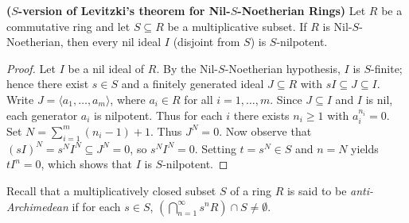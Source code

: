 \documentclass[11pt]{article}
\begin{document}
\begin{theorem} \label{Levitzki-2}\textbf{($S$-version of Levitzki's theorem for Nil-$S$-Noetherian Rings)}
Let $R$ be a commutative ring and let $S\subseteq R$ be a multiplicative subset. If $R$ is Nil-$S$-Noetherian, then every nil ideal $I$ (disjoint from $S$) is  $S$-nilpotent.
\end{theorem}

\begin{proof}
Let $I$ be a nil ideal of $R$. By the Nil-$S$-Noetherian hypothesis, $I$ is $S$-finite; hence there exist $s\in S$ and a finitely generated ideal $J\subseteq R$ with $sI \subseteq J\subseteq I$. Write $J=\langle a_1,\dots,a_m \rangle$, where $a_{i}\in R$ for all $i=1,\ldots, m$. Since $J\subseteq I$ and $I$ is nil, each generator $a_i$ is nilpotent. Thus for each $i$ there exists $n_i\ge1$ with $a_i^{n_i}=0$. Set $N=\sum\limits_{i=1}^m (n_i-1)+ 1$. Thus $J^N = 0$. Now observe that $(sI)^N = s^N I^N \subseteq J^N = 0$, so $s^N I^N = 0$. Setting $t= s^N \in S$ and $n= N$ yields $tI^n = 0$, which shows that $I$ is $S$-nilpotent.
\end{proof}

Recall \cite{ad02} that a multiplicatively closed subset $S$ of a ring $R$ is said to be \textit{anti-Archimedean} if for each $s \in S$, $\left(\bigcap_{n=1}^{\infty} s^n R \right) \cap S \neq \emptyset$.
\end{document}
